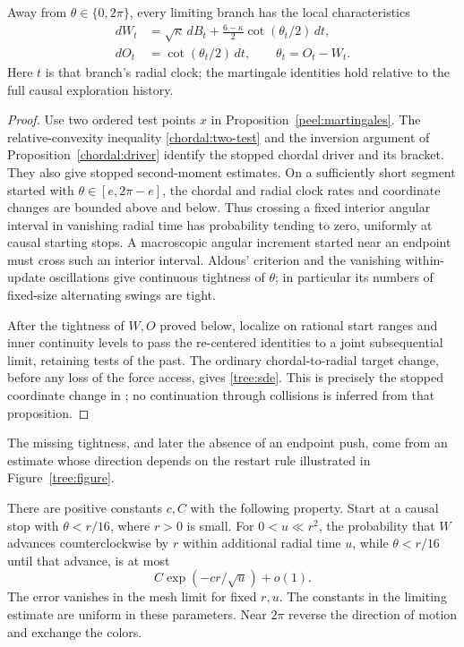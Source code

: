 \begin{lemma}\label{tree:interior}
Away from $\theta\in\{0,2\pi\}$, every limiting branch has the local
characteristics
\begin{equation}\label{tree:sde}
 \begin{aligned}
 dW_t&=\sqrt\kappa\,dB_t+
          \frac{6-\kappa}{2}\cot(\theta_t/2)\,dt,\\
 dO_t&=\cot(\theta_t/2)\,dt,\qquad \theta_t=O_t-W_t.
 \end{aligned}
\end{equation}
Here $t$ is that branch's radial clock; the martingale identities hold
relative to the full causal exploration history.
\end{lemma}

\begin{proof}
Use two ordered test points $x$ in Proposition~\ref{peel:martingales}.
The relative-convexity inequality \eqref{chordal:two-test} and the inversion
argument of Proposition~\ref{chordal:driver} identify the stopped
chordal driver and its bracket.  They also give
stopped second-moment estimates.  On a sufficiently short segment
started with $\theta\in[e,2\pi-e]$, the chordal and radial clock rates
and coordinate changes are bounded above and below.  Thus crossing a
fixed interior angular interval in vanishing radial time has
probability tending to zero, uniformly at causal starting stops.
A macroscopic angular increment started near an endpoint must cross
such an interior interval.  Aldous' criterion and the vanishing
within-update oscillations give continuous tightness of $\theta$;
in particular its numbers of fixed-size alternating swings are tight.

After the tightness of $W,O$ proved below, localize on rational start
ranges and inner continuity levels to pass the re-centered identities
to a joint subsequential limit, retaining tests of the past.  The
ordinary chordal-to-radial target change, before any loss of the force
access, gives \eqref{tree:sde}.  This is precisely the stopped
coordinate change in \citet[Proposition~3.12]{Sheffield2009Exploration};
no continuation through collisions is inferred from that proposition.
\end{proof}

The missing tightness, and later the absence of an endpoint push, come
from an estimate whose direction depends on the restart rule
illustrated in Figure~\ref{tree:figure}.

\begin{lemma}\label{tree:bar}
There are positive constants $c,C$ with the following property.  Start
at a causal stop with $\theta<r/16$, where $r>0$ is small.  For
$0<u\ll r^2$, the probability that $W$ advances counterclockwise by
$r$ within additional radial time $u$, while $\theta<r/16$ until that
advance, is at most
\begin{equation}\label{tree:bar-bound}
 C\exp(-cr/\sqrt u)+o(1).
\end{equation}
The error vanishes in the mesh limit for fixed $r,u$.  The constants
in the limiting estimate are uniform in these parameters.  Near
$2\pi$ reverse the direction of motion and exchange the colors.
\end{lemma}

